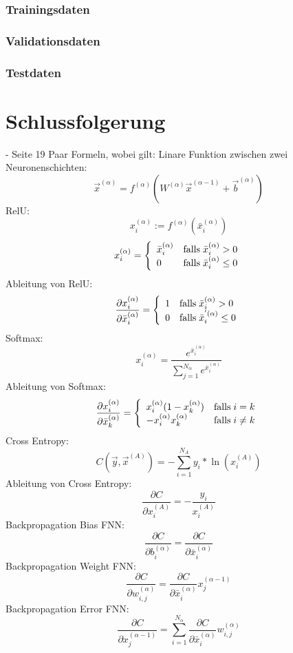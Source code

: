 \documentclass[11pt]{article}
\begin{document}
\subsubsection{Trainingsdaten}
\subsubsection{Validationsdaten}
\subsubsection{Testdaten}


\section{Schlussfolgerung}
- Seite 19
Paar Formeln, wobei gilt:
Linare Funktion zwischen zwei Neuronenschichten:
\[ \vec{x}^{(\alpha)}=f^{(\alpha)}(W^{(\alpha)} \vec{x}^{(\alpha-1)} + \vec{b}^{(\alpha)}) \]
RelU:
\[ x_i^{(\alpha)} := f^{(\alpha)}(\bar{x}_i^{(\alpha)}) \]
\[ x_i^{(\alpha)}= \left\{
	\begin{array}{ll}
		\bar{x}_i^{(\alpha)}  & \mathrm{falls} \mkern5mu \bar{x}_i^{(\alpha)} > 0 \\
		0 & \mathrm{falls} \mkern5mu \bar{x}_i^{(\alpha)} \leq 0
	\end{array}
\right. \]
Ableitung von RelU:
\[ \frac{\partial x_i^{(\alpha)}}{\partial \bar{x}_i^{(\alpha)}} = \left\{
	\begin{array}{ll}
		1  & \mathrm{falls} \mkern5mu \bar{x}_i^{(\alpha)} > 0 \\
		0 & \mathrm{falls} \mkern5mu \bar{x}_i^{'(\alpha)} \leq 0
	\end{array}
\right. \]
Softmax:
\[ x_i^{(\alpha)} = \frac{e^{\bar{x}_i^{(\alpha)}}}{\sum_{j=1}^{N_{\alpha}} e^{\bar{x}_i^{(\alpha)}}} \]
Ableitung von Softmax:
\[ \frac{\partial x_i^{(\alpha)}}{\partial \bar{x}_k^{(\alpha)}} = \left\{
	\begin{array}{ll}
		x_i^{(\alpha)}(1-x_k^{(\alpha)})  & \mathrm{falls} \mkern5mu i = k \\
		-x_i^{(\alpha)}x_k^{(\alpha)} & \mathrm{falls} \mkern5mu i \neq k
	\end{array}
\right. \]
Cross Entropy:
\[ C(\vec{y},\vec{x}^{(A)}) = -\sum_{i=1}^{N_A} y_i * \ln(x_i^{(A)}) \]
Ableitung von Cross Entropy:
\[ \frac{\partial C}{\partial x_i^{(A)}} = -\frac{y_i}{x_i^{(A)}} \]
Backpropagation Bias FNN:
\[ \frac{\partial C}{\partial b_i^{(\alpha)}} = \frac{\partial C}{\partial \bar{x}_i^{(\alpha)}} \]
Backpropagation Weight FNN:
\[ \frac{\partial C}{\partial w_{i,j}^{(\alpha)}} = \frac{\partial C}{\partial \bar{x}_i^{(\alpha)}} x_j^{(\alpha-1)} \]
Backpropagation Error FNN:
\[ \frac{\partial C}{\partial x_{j}^{(\alpha-1)}} = \sum_{i=1}^{N_{\alpha}} \frac{\partial C}{\partial \bar{x}_i^{(\alpha)}} w_{i,j}^{(\alpha)} \]
\end{document}
